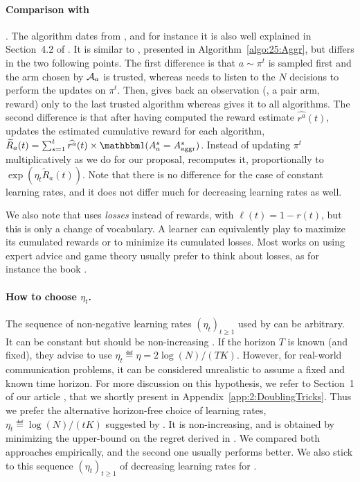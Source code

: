\paragraph{Comparison with \ExpQ}.\label{sub:25:Exp4}
%
The \ExpQ{} algorithm dates from \cite{Auer02NonStochastic}, and for instance it is also well explained in Section~4.2 of \cite{Bubeck12}.
It is similar to \Aggr{}, presented in Algorithm~\ref{algo:25:Aggr},
but differs in the two following points.
%
The first difference is that $a\sim\pi^t$ is sampled first and the arm chosen by $\mathcal{A}_a$ is trusted, whereas \Aggr{}
needs to listen to the $N$ decisions to perform the updates on $\pi^{t}$.
Then, \ExpQ{} gives back an observation (\ie, a pair arm, reward) only to the last trusted algorithm
whereas \Aggr{} gives it to all algorithms.
%
The second difference is that after having computed the reward estimate $\widehat{r^a}(t)$, \ExpQ{} updates the estimated cumulative reward for each algorithm,
$\widetilde{R}_a(t) = \sum_{s=1}^{t} \widehat{r^a}(t) \times \indic(A^{s}_{a} = A^{s}_{\mathrm{aggr}})$.
%
Instead of updating $\pi^{t}$ multiplicatively as we do for our proposal, \ExpQ{} recomputes it, proportionally to
$\exp(\eta_t \widetilde{R}_a(t))$.
Note that there is no difference for the case of constant learning rates, and it does not differ much for decreasing learning rates as well.

We also note that \ExpQ{} uses \emph{losses} instead of rewards, with $\ell(t) = 1 - r(t)$, but this is only a change of vocabulary.
A learner can equivalently play to maximize its cumulated rewards or to minimize its cumulated losses.
Most works on using expert advice and game theory usually prefer to think about losses, as for instance the book \cite{CesaLugosi06}.


\paragraph{How to choose $\eta_t$.}
%
The sequence of non-negative learning rates $(\eta_t)_{t \geq 1}$ used by \ExpQ{} can be arbitrary.
It can be constant but should be non-increasing \cite[Theorem 4.2]{Bubeck12}.
If the horizon $T$ is known (and fixed), they advise to use $\eta_t \eqdef \eta = 2 \log(N) / (T K)$.
However, for real-world communication problems, it can be considered unrealistic to assume a fixed and known time horizon.
For more discussion on this hypothesis, we refer to Section~1 of our article \cite{Besson2018DoublingTricks}, that we shortly present in Appendix~\ref{app:2:DoublingTricks}.
%
Thus we prefer the alternative horizon-free choice of learning rates,
$\eta_t \eqdef \log(N) / (t K)$ suggested by \cite{Bubeck12}.
It is non-increasing, and is obtained by minimizing the upper-bound on the regret derived in \cite[pp48]{Bubeck12}.
%
We compared both approaches empirically, and the second one usually performs better.
We also stick to this sequence $(\eta_t)_{t \geq 1}$ of decreasing learning rates for \Aggr.



